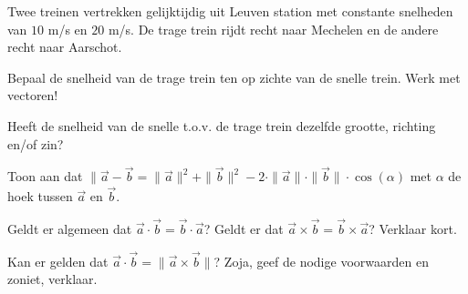 \documentclass{ximera}
\begin{document}
\begin{exercise}
	Twee treinen vertrekken gelijktijdig uit Leuven station met constante snelheden van \(10\) m/s en \(20\) m/s. 
	De trage trein rijdt recht naar Mechelen en de andere recht naar Aarschot. 
	
	\begin{image}
	\end{image}

	\begin{question}
		Bepaal de snelheid van de trage trein ten op zichte van de snelle trein. Werk met vectoren!
	\end{question}

	\begin{question}
		Heeft de snelheid van de snelle t.o.v. de trage trein dezelfde grootte, richting en/of zin?
	\end{question}
	\end{exercise}

\begin{exercise}
	Toon aan dat \( \| \vec{a} - \vec{b} = \|\vec{a}\|^2 + \|\vec{b}\|^2 - 2 \cdot \|\vec{a}\| \cdot \|\vec{b}\| \cdot \cos(\alpha)\) met \(\alpha\) de hoek tussen \(\vec{a}\) en \(\vec{b}\). 
\end{exercise}

\begin{exercise}
	Geldt er algemeen dat \(\vec{a} \cdot \vec{b} = \vec{b} \cdot \vec{a}\)? 
	Geldt er dat \(\vec{a} \times \vec{b} = \vec{b} \times \vec{a}\)? 
	Verklaar kort.
\end{exercise}

\begin{exercise}
	Kan er gelden dat \(\vec{a} \cdot \vec{b} = \| \vec{a} \times \vec{b} \|\)? 
	Zoja, geef de nodige voorwaarden en zoniet, verklaar. 
\end{exercise}
\end{document}
